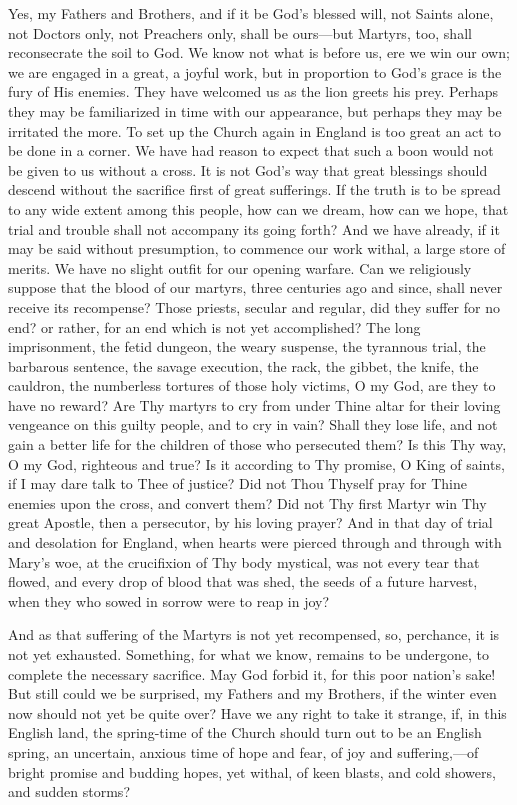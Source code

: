 Yes, my Fathers and Brothers, and if it be God's
blessed will, not Saints alone, not Doctors only, not
Preachers only, shall be ours—but Martyrs, too,
shall reconsecrate the soil to God. We know not what is
before us, ere we win our own; we are engaged in a great,
a joyful work, but in proportion to God's grace is the
fury of His enemies. They have welcomed us as the lion
greets his prey. Perhaps they may be familiarized in time
with our appearance, but perhaps they may be irritated
the more. To set up the Church again in England is too
great an act to be done in a corner. We have had reason
to expect that such a boon would not be given to us
without a cross. It is not God's way that great blessings
should descend without the sacrifice first of great
sufferings. If the truth is to be spread to any wide
extent among this people, how can we dream, how can we
hope, that trial and trouble shall not accompany its
going forth? And we have already, if it may be said
without presumption, to commence our work withal, a large
store of merits. We have no slight outfit for our opening
warfare. Can we religiously suppose that the blood of our
martyrs, three centuries ago and since, shall never
receive its recompense? Those priests, secular and regular, did they suffer for no end? or rather, for an
end which is not yet accomplished? The long imprisonment,
the fetid dungeon, the weary suspense, the tyrannous
trial, the barbarous sentence, the savage execution, the
rack, the gibbet, the knife, the cauldron, the numberless
tortures of those holy victims, O my God, are they to
have no reward? Are Thy martyrs to cry from under Thine
altar for their loving vengeance on this guilty people,
and to cry in vain? Shall they lose life, and not gain a
better life for the children of those who persecuted
them? Is this Thy way, O my God, righteous and true? Is
it according to Thy promise, O King of saints, if I may
dare talk to Thee of justice? Did not Thou Thyself pray
for Thine enemies upon the cross, and convert them? Did
not Thy first Martyr win Thy great Apostle, then a
persecutor, by his loving prayer? And in that day of
trial and desolation for England, when hearts were
pierced through and through with Mary's woe, at the
crucifixion of Thy body mystical, was not every tear that
flowed, and every drop of blood that was shed, the seeds
of a future harvest, when they who sowed in sorrow were
to reap in joy?

And as that suffering of the Martyrs is not yet
recompensed, so, perchance, it is not yet exhausted.
Something, for what we know, remains to be undergone, to
complete the necessary sacrifice. May God forbid it, for
this poor nation's sake! But still could we be surprised,
my Fathers and my Brothers, if the winter even now should
not yet be quite over? Have we any right to take it
strange, if, in this English land, the spring-time of the
Church should turn out to be an English spring, an
uncertain, anxious time of hope and fear, of joy and
suffering,—of bright promise and budding hopes, yet
withal, of keen blasts, and cold showers, and sudden
storms?

